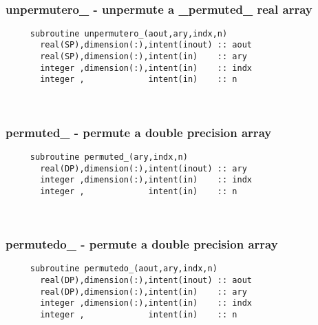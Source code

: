  
\mbox{}\hrulefill\ 
 

  \subsubsection{unpermutero\_ - unpermute a \_permuted\_ real array}

\begin{verbatim} 
     subroutine unpermutero_(aout,ary,indx,n)
       real(SP),dimension(:),intent(inout) :: aout
       real(SP),dimension(:),intent(in)    :: ary
       integer ,dimension(:),intent(in)    :: indx
       integer ,             intent(in)    :: n
 \end{verbatim}%
 
 
\mbox{}\hrulefill\ 
 
  \subsubsection{permuted\_ - permute a double precision array}

\begin{verbatim} 
     subroutine permuted_(ary,indx,n)
       real(DP),dimension(:),intent(inout) :: ary
       integer ,dimension(:),intent(in)    :: indx
       integer ,             intent(in)    :: n
 \end{verbatim}%
 
 
\mbox{}\hrulefill\ 
 
  \subsubsection{permutedo\_ - permute a double precision array}

\begin{verbatim} 
     subroutine permutedo_(aout,ary,indx,n)
       real(DP),dimension(:),intent(inout) :: aout
       real(DP),dimension(:),intent(in)    :: ary
       integer ,dimension(:),intent(in)    :: indx
       integer ,             intent(in)    :: n
 \end{verbatim}%
 
